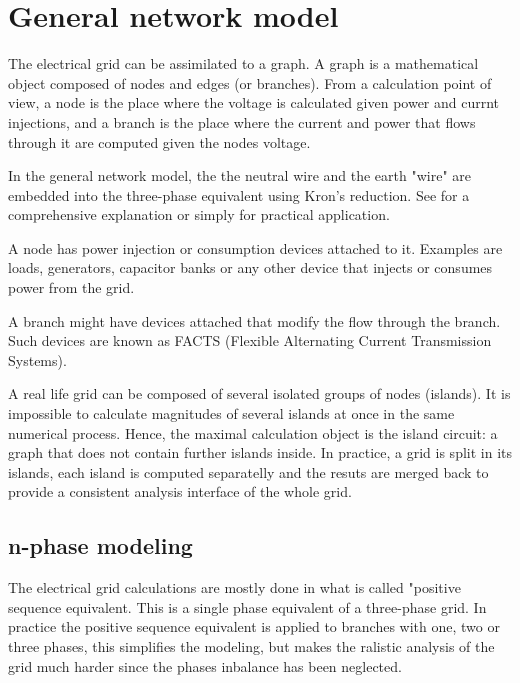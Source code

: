 \documentclass{tufte-book}
\begin{document}
\chapter{General network model}

The electrical grid can be assimilated to a graph. A graph is a mathematical object composed of nodes and edges (or branches). From a calculation point of view, a node is the place where the voltage is calculated given power and currnt injections, and a branch is the place where the current and power that flows through it are computed given the nodes voltage.

In the general network model, the the neutral wire and the earth "wire" are embedded into the three-phase equivalent using Kron's reduction. See \cite{dorfler2013kron} for a comprehensive explanation or simply \cite{kersting2012distribution} for practical application.

A node has power injection or consumption devices attached to it. Examples are loads, generators, capacitor banks or any other device that injects or consumes power from the grid.

A branch might have devices attached that modify the flow through the branch. Such devices are known as FACTS (Flexible Alternating Current Transmission Systems). 

A real life grid can be composed of several isolated groups of nodes (islands). It is impossible to calculate magnitudes of several islands at once in the same numerical process. Hence, the maximal calculation object is the island circuit: a graph that does not contain further islands inside. In practice, a grid is split in its islands, each island is computed separatelly and the resuts are merged back to provide a consistent analysis interface of the whole grid.

\section{n-phase modeling}

The electrical grid calculations are mostly done in what is called "positive sequence equivalent. This is a single phase equivalent of a three-phase grid. In practice the positive sequence equivalent is applied to branches with one, two or three phases, this simplifies the modeling, but makes the ralistic analysis of the grid much harder since the phases inbalance has been neglected.
\end{document}
